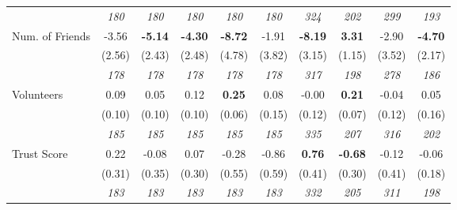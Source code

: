 \begin{tabular}{l c c c c c c c c c}
& \textit{ 180 } & \textit{ 180 } & \textit{ 180 } & \textit{ 180 } & \textit{ 180 } & \textit{ 324 } & \textit{ 202 } & \textit{ 299 } & \textit{ 193 } \\
Num. of Friends & -3.56 & \textbf{ -5.14 } & \textbf{ -4.30 } & \textbf{-8.72} & -1.91 & \textbf{ -8.19 } & \textbf{3.31} & -2.90 & \textbf{-4.70} \\
& (2.56) & (2.43) & (2.48) & (4.78) & (3.82) & (3.15) & (1.15) & (3.52) & (2.17) \\
& \textit{ 178 } & \textit{ 178 } & \textit{ 178 } & \textit{ 178 } & \textit{ 178 } & \textit{ 317 } & \textit{ 198 } & \textit{ 278 } & \textit{ 186 } \\
Volunteers & 0.09 & 0.05 & 0.12 & \textbf{0.25} & 0.08 & -0.00 & \textbf{0.21} & -0.04 & 0.05 \\
& (0.10) & (0.10) & (0.10) & (0.06) & (0.15) & (0.12) & (0.07) & (0.12) & (0.16) \\
& \textit{ 185 } & \textit{ 185 } & \textit{ 185 } & \textit{ 185 } & \textit{ 185 } & \textit{ 335 } & \textit{ 207 } & \textit{ 316 } & \textit{ 202 } \\
Trust Score & 0.22 & -0.08 & 0.07 & -0.28 & -0.86 & \textbf{ 0.76 } & \textbf{-0.68} & -0.12 & -0.06 \\
& (0.31) & (0.35) & (0.30) & (0.55) & (0.59) & (0.41) & (0.30) & (0.41) & (0.18) \\
& \textit{ 183 } & \textit{ 183 } & \textit{ 183 } & \textit{ 183 } & \textit{ 183 } & \textit{ 332 } & \textit{ 205 } & \textit{ 311 } & \textit{ 198 } \\
\bottomrule
\end{tabular}
